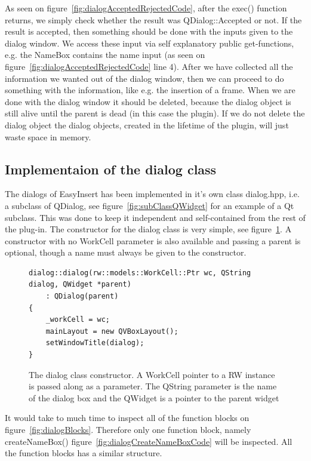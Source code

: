 As seen on figure~\ref{fig:dialogAcceptedRejectedCode}, after the exec() function returns, we simply check whether the result was QDialog::Accepted or not. If the result is accepted, then something should be done with the inputs given to the dialog window. We access these input via self explanatory public get-functions, e.g. the NameBox contains the name input (as seen on figure~\ref{fig:dialogAcceptedRejectedCode} line 4). After we have collected all the information we wanted out of the dialog window, then we can proceed to do something with the information, like e.g. the insertion of a frame. When we are done with the dialog window it should be deleted, because the dialog object is still alive until the parent is dead (in this case the plugin). If we do not delete the dialog object the dialog objects, created in the lifetime of the plugin, will just waste space in memory. 

\subsection{Implementaion of the dialog class}
The dialogs of EasyInsert has been implemented in it's own class dialog.hpp, i.e. a subclass of QDialog, see figure~\ref{fig:subClassQWidget} for an example of a Qt subclass. This was done to keep it independent and self-contained from the rest of the plug-in. The constructor for the dialog class is very simple, see figure~\ref{fig:dialogConstructor}. A constructor with no WorkCell parameter is also available and passing a parent is optional, though a name must always be given to the constructor. 

\begin{figure}[h] %
\centering
\lstset{language=C++} 
\begin{lstlisting}[frame=single]  
dialog::dialog(rw::models::WorkCell::Ptr wc, QString dialog, QWidget *parent)
    : QDialog(parent)
{
    _workCell = wc;
    mainLayout = new QVBoxLayout();
    setWindowTitle(dialog);
}			 
\end{lstlisting}
\caption{The dialog class constructor. A WorkCell pointer to a RW instance is passed along as a parameter. The QString parameter is the name of the dialog box and the QWidget is a pointer to the parent widget }
\label{fig:dialogConstructor} 	
\end{figure}

It would take to much time to inspect all of the function blocks on figure~\ref{fig:dialogBlocks}. Therefore only one function block, namely createNameBox() figure~\ref{fig:dialogCreateNameBoxCode} will be inspected. All the function blocks has a similar structure.

